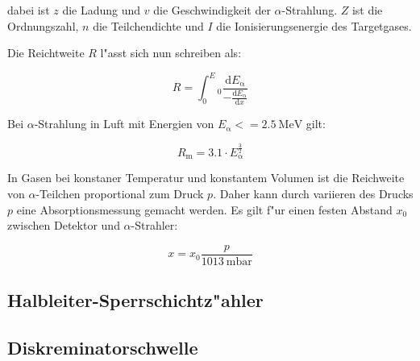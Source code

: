 dabei ist $z$ die Ladung und $v$ die Geschwindigkeit der $\alpha$-Strahlung. $Z$ ist die Ordnungszahl, $n$ die Teilchendichte und $I$ die Ionisierungsenergie des Targetgases.

Die Reichtweite $R$ l"asst sich nun schreiben als:

\begin{equation}
	R = \int_0^E_\mathrm{0} \frac{\mathrm{d}E_\mathrm{\alpha}}{- \frac{\mathrm{d}E_\mathrm{\alpha}}{\mathrm{d}x}}
\end{equation}

Bei $\alpha$-Strahlung in Luft mit Energien von $E_\mathrm{\alpha} <= \SI{2.5}{\mega\electronvolt}$ gilt:

\begin{equation}
	R_\mathrm{m} = 3.1 \cdot E_\mathrm{\alpha}^\frac{3}{2}
\end{equation}

In Gasen bei konstaner Temperatur und konstantem Volumen ist die Reichweite von $\alpha$-Teilchen proportional zum Druck $p$. Daher kann durch variieren des Drucks $p$ eine Absorptionsmessung gemacht werden. Es gilt f"ur einen festen Abstand $x_\mathrm{0}$ zwischen Detektor und $\alpha$-Strahler:

\begin{equation}
	x = x_\mathrm{0} \frac{p}{\SI{1013}{\milli\bar}}
\end{equation}

\subsection{Halbleiter-Sperrschichtz"ahler} %
\label{sub:halbleiter_sperrschichtz_ahler}


\subsection{Diskreminatorschwelle} %
\label{sub:diskreminatorschwelle}
